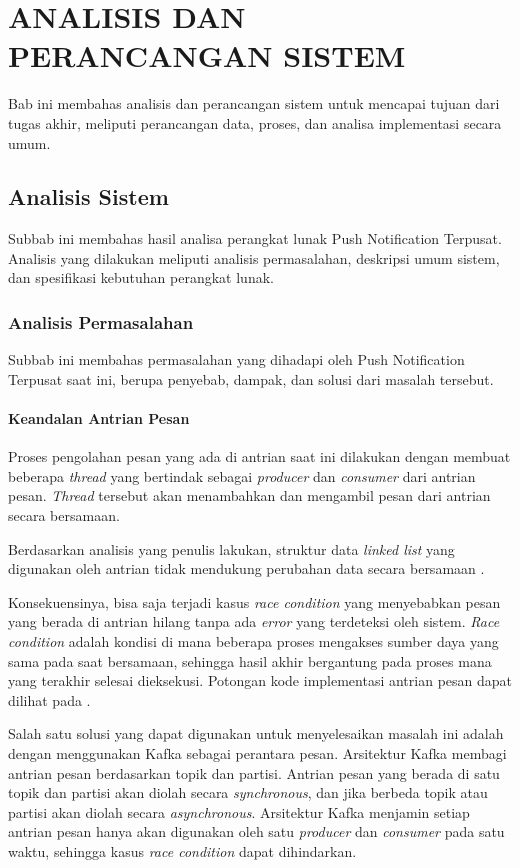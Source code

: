 \chapter{ANALISIS DAN PERANCANGAN SISTEM}
\par Bab ini membahas analisis dan perancangan sistem untuk mencapai tujuan dari tugas akhir, meliputi perancangan data, proses, dan analisa implementasi secara umum.

\section{Analisis Sistem}
\par Subbab ini membahas hasil analisa perangkat lunak Push Notification Terpusat.
Analisis yang dilakukan meliputi analisis permasalahan, deskripsi umum sistem, dan spesifikasi kebutuhan perangkat lunak.

\subsection{Analisis Permasalahan}
\par Subbab ini membahas permasalahan yang dihadapi oleh Push Notification Terpusat saat ini, berupa penyebab, dampak, dan solusi dari masalah tersebut.

\subsubsection{Keandalan Antrian Pesan}
\par Proses pengolahan pesan yang ada di antrian saat ini dilakukan dengan membuat beberapa \textit{thread} yang bertindak sebagai \textit{producer} dan \textit{consumer} dari antrian pesan. \textit{Thread} tersebut akan menambahkan dan mengambil pesan dari antrian secara bersamaan.
\par Berdasarkan analisis yang penulis lakukan, struktur data \textit{linked list} yang digunakan oleh antrian tidak mendukung perubahan data secara bersamaan \cite{linkedlist-online}.
\par Konsekuensinya, bisa saja terjadi kasus \textit{race condition} yang menyebabkan pesan yang berada di antrian hilang tanpa ada \textit{error} yang terdeteksi oleh sistem. \textit{Race condition} adalah kondisi di mana beberapa proses mengakses sumber daya yang sama pada saat bersamaan, sehingga hasil akhir bergantung pada proses mana yang terakhir selesai dieksekusi. Potongan kode implementasi antrian pesan dapat dilihat pada .
\par Salah satu solusi yang dapat digunakan untuk menyelesaikan masalah ini adalah dengan menggunakan Kafka sebagai perantara pesan. Arsitektur Kafka membagi antrian pesan berdasarkan topik dan partisi. Antrian pesan yang berada di satu topik dan partisi akan diolah secara \textit{synchronous}, dan jika berbeda topik atau partisi akan diolah secara \textit{asynchronous}. Arsitektur Kafka menjamin setiap antrian pesan hanya akan digunakan oleh satu \textit{producer} dan \textit{consumer} pada satu waktu, sehingga kasus \textit{race condition} dapat dihindarkan.

